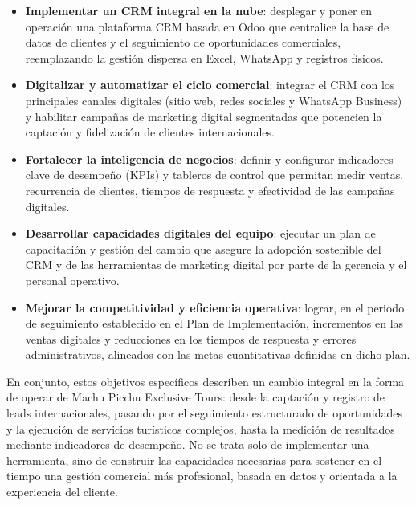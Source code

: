 \begin{indentedsubsection}
\begin{itemize}
    \item[a.] \textbf{Implementar un CRM integral en la nube}: desplegar y poner en operación una plataforma CRM basada en Odoo que centralice la base de datos de clientes y el seguimiento de oportunidades comerciales, reemplazando la gestión dispersa en Excel, WhatsApp y registros físicos.
    \item[b.] \textbf{Digitalizar y automatizar el ciclo comercial}: integrar el CRM con los principales canales digitales (sitio web, redes sociales y WhatsApp Business) y habilitar campañas de marketing digital segmentadas que potencien la captación y fidelización de clientes internacionales.
    \item[c.] \textbf{Fortalecer la inteligencia de negocios}: definir y configurar indicadores clave de desempeño (KPIs) y tableros de control que permitan medir ventas, recurrencia de clientes, tiempos de respuesta y efectividad de las campañas digitales.
    \item[d.] \textbf{Desarrollar capacidades digitales del equipo}: ejecutar un plan de capacitación y gestión del cambio que asegure la adopción sostenible del CRM y de las herramientas de marketing digital por parte de la gerencia y el personal operativo.
    \item[e.] \textbf{Mejorar la competitividad y eficiencia operativa}: lograr, en el periodo de seguimiento establecido en el Plan de Implementación, incrementos en las ventas digitales y reducciones en los tiempos de respuesta y errores administrativos, alineados con las metas cuantitativas definidas en dicho plan.
\end{itemize}

En conjunto, estos objetivos específicos describen un cambio integral en la forma de operar de Machu Picchu Exclusive Tours: desde la captación y registro de leads internacionales, pasando por el seguimiento estructurado de oportunidades y la ejecución de servicios turísticos complejos, hasta la medición de resultados mediante indicadores de desempeño. No se trata solo de implementar una herramienta, sino de construir las capacidades necesarias para sostener en el tiempo una gestión comercial más profesional, basada en datos y orientada a la experiencia del cliente.

\end{indentedsubsection}

